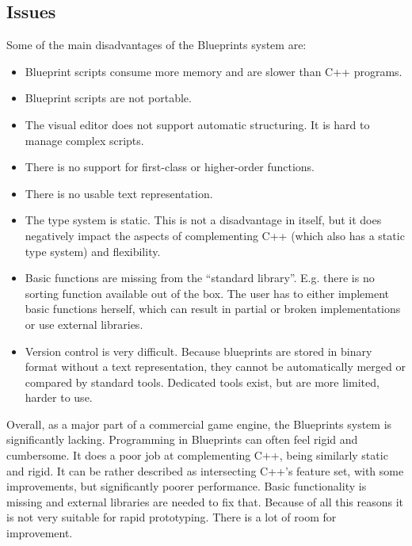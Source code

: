 \subsection{Issues}
Some of the main disadvantages of the Blueprints system are\cite{blu_disadvantages_1, blu_disadvantages_2, blueprint, blu_lambda}:
\begin{itemize}
    \item Blueprint scripts consume more memory and are slower than C++ programs.
    
    \item Blueprint scripts are not portable.
    
    \item The visual editor does not support automatic structuring. It is hard to manage complex scripts.
    
    \item There is no support for first-class or higher-order functions.
    
    \item There is no usable text representation.
        
    \item The type system is static. This is not a disadvantage in itself, but it does negatively impact the aspects of complementing C++ (which also has a static type system) and flexibility.
    
    \item Basic functions are missing from the ``standard library''. E.g. there is no sorting function available out of the box\cite{blu_sort}. The user has to either implement basic functions herself, which can result in partial or broken implementations or use external libraries\cite{blu_library}.
    
    \item Version control is very difficult. Because blueprints are stored in binary format without a text representation, they cannot be automatically merged or compared by standard tools. Dedicated tools exist, but are more limited, harder to use.
\end{itemize}

Overall, as a major part of a commercial game engine, the Blueprints system is significantly lacking. Programming in Blueprints can often feel rigid and cumbersome. It does a poor job at complementing C++, being similarly static and rigid. It can be rather described as intersecting C++'s feature set, with some improvements, but significantly poorer performance. Basic functionality is missing and external libraries are needed to fix that. Because of all this reasons it is not very suitable for rapid prototyping. There is a lot of room for improvement.

